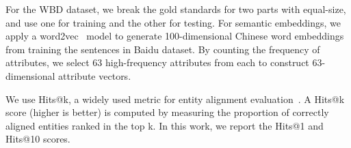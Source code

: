 	For the WBD dataset, we break the gold standards for two parts with equal-size, and use one for training and the other for testing.
	For semantic embeddings, we apply a word2vec~\cite{Mikolov2013Efficient} model to generate 100-dimensional Chinese word embeddings from training the sentences in Baidu dataset.
	By counting the frequency of attributes, we select 63 high-frequency attributes from each \KG to construct 63-dimensional attribute vectors.



	
 	We use Hits@k, a widely used metric for entity
 alignment evaluation~\cite{hao2016joint,chen2016multilingual,sun2017cross,zhu2017iterative}. A Hits@k score (higher is better) is computed by
 measuring the proportion of correctly aligned entities ranked in the top k. In this work, we report the Hits@1 and Hits@10 scores.
	
	
